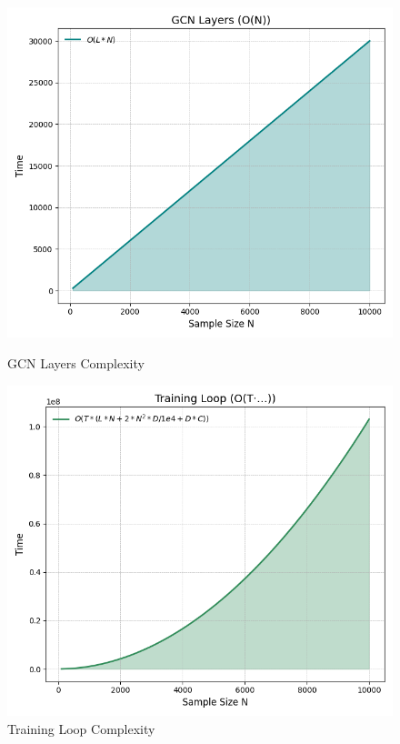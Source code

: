 \begin{figure}[htbp]
	\centering
	\begin{minipage}[b]{0.45\linewidth}
		\includegraphics[width=\linewidth]{img/paper_3/gcn_layers_on}
		\caption{GCN Layers Complexity}
		\label{fig:gcnlayerson}
	\end{minipage}
	\hfill
	\begin{minipage}[b]{0.45\linewidth}
		\includegraphics[width=\linewidth]{img/paper_3/training_loop_ot·…}
		\caption{Training Loop Complexity}
		\label{fig:trainingloopot}
	\end{minipage}
\end{figure}
